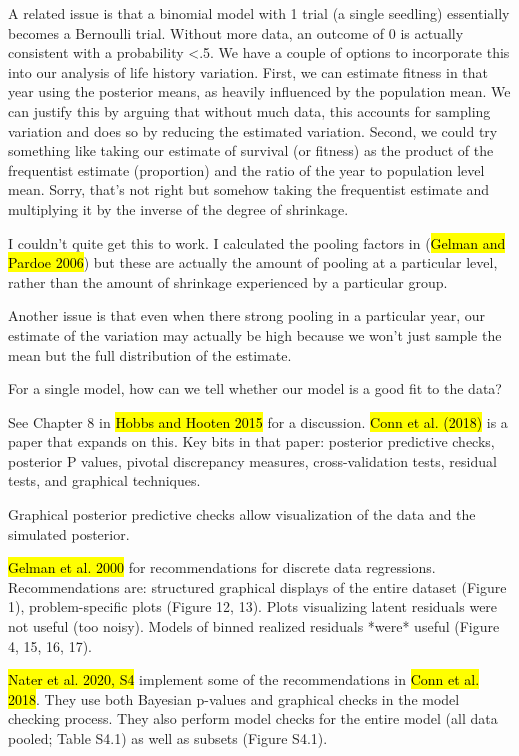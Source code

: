 \documentclass[12pt, oneside, titlepage]{article}   	%
\begin{document}
A related issue is that a binomial model with 1 trial (a single seedling) essentially becomes a Bernoulli trial. Without more data, an outcome of 0 is actually consistent with a probability <.5. We have a couple of options to incorporate this into our analysis of life history variation. First, we can estimate fitness in that year using the posterior means, as heavily influenced by the population mean. We can justify this by arguing that without much data, this accounts for sampling variation and does so by reducing the estimated variation. Second, we could try something like taking our estimate of survival (or fitness) as the product of the frequentist estimate (proportion) and the ratio of the year to population level mean. Sorry, that's not right but somehow taking the frequentist estimate and multiplying it by the inverse of the degree of shrinkage. 

I couldn't quite get this to work. I calculated the pooling factors in (\hl{Gelman and Pardoe 2006}) but these are actually the amount of pooling at a particular level, rather than the amount of shrinkage experienced by a particular group.

Another issue is that even when there strong pooling in a particular year, our estimate of the variation may actually be high because we won't just sample the mean but the full distribution of the estimate. 

For a single model, how can we tell whether our model is a good fit to the data?

See Chapter 8 in \hl{Hobbs and Hooten 2015} for a discussion. \hl{Conn et al. (2018)} is a paper that expands on this. Key bits in that paper: posterior predictive checks, posterior P values, pivotal discrepancy measures, cross-validation tests, residual tests, and graphical techniques.

Graphical posterior predictive checks allow visualization of the data and the simulated posterior.

\hl{Gelman et al. 2000} for recommendations for discrete data regressions. Recommendations are: structured graphical displays of the entire dataset (Figure 1), problem-specific plots (Figure 12, 13). Plots visualizing latent residuals were not useful (too noisy). Models of binned realized residuals *were* useful (Figure 4, 15, 16, 17).

\hl{Nater et al. 2020, S4} implement some of the recommendations in \hl{Conn et al. 2018}. They use both Bayesian p-values and graphical checks in the model checking process. They also perform model checks for the entire model (all data pooled; Table S4.1) as well as subsets (Figure S4.1).
\end{document}
